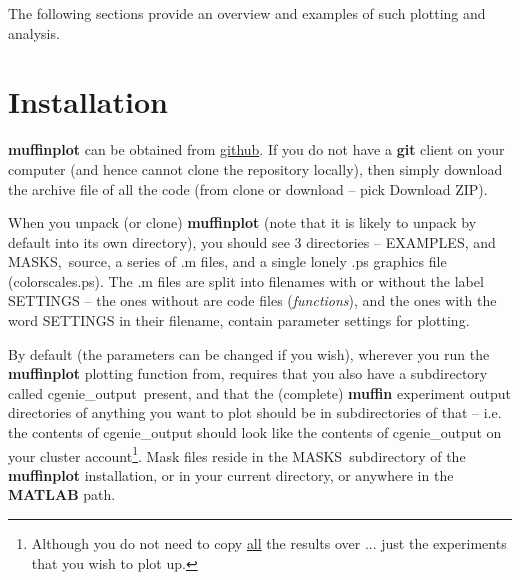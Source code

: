 \documentclass[11pt,fleqn]{book} %
\begin{document}
The following sections provide an overview and examples of such plotting and analysis.


\section{Installation}

\textbf{muffinplot} can be obtained from \href{https://github.com/derpycode/muffinplot\#https://github.com/derpycode/muffinplot}{github}. If you do not have a \textbf{git} client on your computer (and hence cannot clone the repository locally), then simply download the archive file of all the code (from \footnotesize\textsf{\textcolor[rgb]{0,0.501961,0}{clone or download }}\normalsize -- pick \textsf{\footnotesize Download ZIP}).

When you unpack (or clone) \textbf{muffinplot} (note that it is likely to unpack by default into its own directory), you should see 3 directories -- \footnotesize\textsf{EXAMPLES}\normalsize, and \footnotesize\textsf{MASKS}\normalsize,\ \footnotesize\textsf{source}\normalsize, a series of \footnotesize\textsf{.m }\normalsize files, and a single lonely \footnotesize\textsf{.ps }\normalsize graphics file (\footnotesize\textsf{colorscales.ps}\normalsize). The \footnotesize\textsf{.m }\normalsize files are split into filenames with or without the label \footnotesize\textsf{SETTINGS }\normalsize -- the ones without are code files (\textit{functions}), and the ones with the word \footnotesize\textsf{SETTINGS }\normalsize in their filename, contain parameter settings for plotting.

By default (the parameters can be changed if you wish), wherever you run the \textbf{muffinplot} plotting function from, requires that you also have a subdirectory called \footnotesize\textsf{cgenie\_output}\normalsize\ present, and that the (complete) \textbf{muffin} experiment output directories of anything you want to plot should be in subdirectories of that -- i.e. the contents of \footnotesize\textsf{cgenie\_output }\normalsize should look like the contents of \footnotesize\textsf{cgenie\_output }\normalsize on your cluster account\footnote{Although you do not need to copy \uline{all} the results over ... just the experiments that you wish to plot up.}. Mask files reside in the \footnotesize\textsf{MASKS}\normalsize\ subdirectory of the \textbf{muffinplot} installation, or in your current directory, or anywhere in the \textbf{MATLAB} path.
\end{document}
